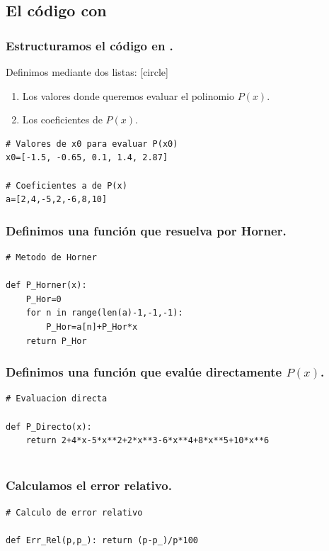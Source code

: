 \subsection{El código con \python}
\begin{frame}[fragile]
\frametitle{Estructuramos el código en \python.}
Definimos mediante dos listas:
[circle]
\begin{enumerate}[<+->]
\item Los valores donde queremos evaluar el polinomio $P(x)$.
\item Los coeficientes de $P(x)$.
\end{enumerate}
\begin{lstlisting}[style= FormattedNumber, basicstyle=\linespread{0.9}\ttfamily\normalsize, columns=fullflexible]
# Valores de x0 para evaluar P(x0)
x0=[-1.5, -0.65, 0.1, 1.4, 2.87]

# Coeficientes a de P(x)
a=[2,4,-5,2,-6,8,10]
\end{lstlisting}
\end{frame}
\begin{frame}[fragile]
\frametitle{Definimos una función que resuelva por Horner.}
\fontsize{14}{14}\selectfont
\begin{lstlisting}[style= FormattedNumber, basicstyle=\linespread{0.9}\ttfamily\normalsize, columns=fullflexible]
# Metodo de Horner

def P_Horner(x):
    P_Hor=0
    for n in range(len(a)-1,-1,-1):     
        P_Hor=a[n]+P_Hor*x
    return P_Hor
\end{lstlisting}
\end{frame}
\begin{frame}[fragile]
\frametitle{Definimos una función que evalúe directamente $P(x)$.}
\fontsize{14}{14}\selectfont
\begin{lstlisting}[style= FormattedNumber, basicstyle=\linespread{0.9}\ttfamily\normalsize, columns=fullflexible]
# Evaluacion directa

def P_Directo(x):
    return 2+4*x-5*x**2+2*x**3-6*x**4+8*x**5+10*x**6
    
\end{lstlisting}
\end{frame}
\begin{frame}[fragile]
\frametitle{Calculamos el error relativo.}
\fontsize{14}{14}\selectfont
\begin{lstlisting}[style= FormattedNumber, basicstyle=\linespread{0.9}\ttfamily\normalsize, columns=fullflexible]
# Calculo de error relativo

def Err_Rel(p,p_): return (p-p_)/p*100
\end{lstlisting}
\end{frame}
